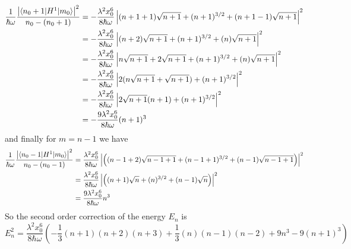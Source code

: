 \documentclass[11pt]{article}
\numberwithin{equation}{section}
\begin{document}
\begin{enumerate}[(a)]
\begin{align*}
\frac{1}{\hbar\omega}\frac{\left|\langle{n_0+1}|H^1|{m_0}\rangle\right|^2}{n_0 - (n_0+1)} &= -\frac{\lambda^2 x_0^6}{8\hbar\omega}\left|(n+1+1)\sqrt{n+1} + (n+1)^{3/2} + (n+1-1)\sqrt{n+1}\right|^2\\
&= -\frac{\lambda^2 x_0^6}{8\hbar\omega}\left|(n+2)\sqrt{n+1} + (n+1)^{3/2} + (n)\sqrt{n+1}\right|^2\\
&= -\frac{\lambda^2 x_0^6}{8\hbar\omega}\left|n\sqrt{n+1} + 2\sqrt{n+1} + (n+1)^{3/2} + (n)\sqrt{n+1}\right|^2\\
&= -\frac{\lambda^2 x_0^6}{8\hbar\omega}\left|2(n\sqrt{n+1} + \sqrt{n+1}) + (n+1)^{3/2}\right|^2\\
&= -\frac{\lambda^2 x_0^6}{8\hbar\omega}\left|2\sqrt{n+1}(n+1) + (n+1)^{3/2}\right|^2\\
&= -\frac{9\lambda^2 x_0^6}{8\hbar\omega}(n+1)^{3}
\end{align*}
and finally for $m=n-1$ we have
\begin{align*}
\frac{1}{\hbar\omega}\frac{\left|\langle{n_0-1}|H^1|{m_0}\rangle\right|^2}{n_0 - (n_0-1)} &= \frac{\lambda^2 x_0^6}{8\hbar\omega}\left|\left((n-1+2)\sqrt{n-1+1} + (n-1+1)^{3/2} +(n-1)\sqrt{n-1+1}\right)\right|^2\\
&= \frac{\lambda^2 x_0^6}{8\hbar\omega}\left|\left((n+1)\sqrt{n} + (n)^{3/2} +(n-1)\sqrt{n}\right)\right|^2\\
&= \frac{9\lambda^2 x_0^6}{8\hbar\omega}n^{3}
\end{align*}
So the second order correction of the energy $E_n$ is
$$E_n^2 = \frac{\lambda^2 x_0^6}{8\hbar\omega}\left(-\frac{1}{3}(n+1)(n+2)(n+3) + \frac{1}{3}(n)(n-1)(n-2) + 9n^{3} - 9(n+1)^{3}\right)$$


\end{enumerate}
\end{document}
